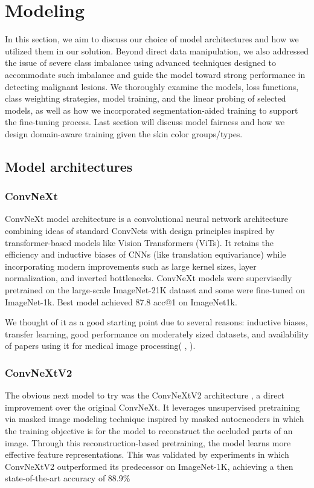 \chapter{Modeling}
\label{ch:modeling}

In this section, we aim to discuss our choice of model architectures and how we utilized them in our solution. Beyond direct data manipulation, we also addressed the issue of severe class imbalance using advanced techniques designed to accommodate such imbalance and guide the model toward strong performance in detecting malignant lesions. We thoroughly examine the models, loss functions, class weighting strategies, model training, and the linear probing of selected models, as well as how we incorporated segmentation-aided training to support the fine-tuning process. Last section will discuss model fairness and how we design domain-aware training given the skin color groups/types.

\section{Model architectures}
\subsection{ConvNeXt}
ConvNeXt \cite{convnext2022} model architecture is a convolutional neural network architecture combining ideas of standard ConvNets with design principles inspired by transformer-based models like Vision Transformers (ViTs). It retains the efficiency and inductive biases of CNNs (like translation equivariance) while incorporating modern improvements such as large kernel sizes, layer normalization, and inverted bottlenecks. 
ConvNeXt models were supervisedly pretrained on the large-scale ImageNet-21K dataset and some were fine-tuned on ImageNet-1k. Best model achieved 87.8 acc@1 on ImageNet1k.

We thought of it as a good starting point due to several reasons: inductive biases, transfer learning, good performance on moderately sized datasets, and availability of papers using it for medical image processing( \cite{MedNeXt}, \cite{liu2023deep}).

\subsection{ConvNeXtV2}
The obvious next model to try was the ConvNeXtV2 architecture \cite{convnext_v2_2023}, a direct improvement over the original ConvNeXt. It leverages unsupervised pretraining via masked image modeling technique inspired by masked autoencoders in which the training objective is for the model to reconstruct the occluded parts of an image. Through this reconstruction-based pretraining, the model learns more effective feature representations. This was validated by experiments in which ConvNeXtV2 outperformed its predecessor on ImageNet-1K, achieving a then state-of-the-art accuracy of 88.9\%


